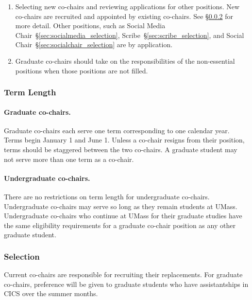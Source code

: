 \begin{enumerate}
\begin{enumerate}
	\end{enumerate}
	\item\label{item:review} Selecting new co-chairs and reviewing applications for other positions. New co-chairs are recruited and appointed by existing co-chairs. See \S\ref{sec:cochairs_selection} for more detail. Other positions, such as Social Media Chair~\S\ref{sec:socialmedia_selection}, Scribe~\S\ref{sec:scribe_selection}, and Social Chair~\S\ref{sec:socialchair_selection} are by application.
	\item\label{item:other} Graduate co-chairs should take on the responsibilities of the non-essential positions when those positions are not filled.
\end{enumerate}

\subsubsection{Term Length}
\label{sec:cochairs_termlength}
\paragraph{Graduate co-chairs.} Graduate co-chairs each serve one term corresponding to one calendar year. Terms begin January 1 and June 1. Unless a co-chair resigns from their position, terms should be staggered between the two co-chairs. A graduate student may not serve more than one term as a co-chair. 

\paragraph{Undergraduate co-chairs.} There are no restrictions on term length for undergraduate co-chairs. Undergraduate co-chairs may serve so long as they remain students at UMass. Undergraduate co-chairs who continue at UMass for their graduate studies have the same eligibility requirements for a graduate co-chair position as any other graduate student.

\subsubsection{Selection}
\label{sec:cochairs_selection}
Current co-chairs are responsible for recruiting their replacements. For graduate co-chairs, preference will be given to graduate students who have assistantships in CICS over the summer months.